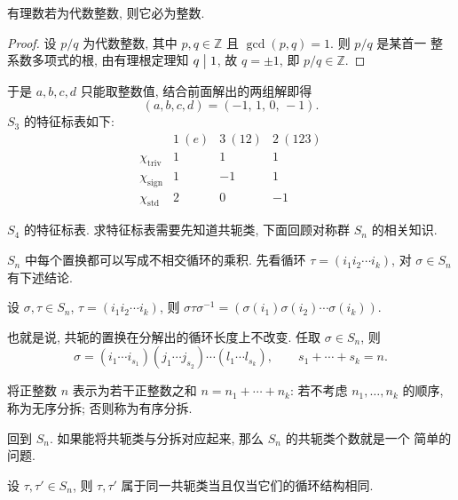 \begin{lemma}\label{lem:rational-alg-int}
有理数若为代数整数, 则它必为整数.
\end{lemma}

\begin{proof}
设 $p/q$ 为代数整数, 其中 $p,q\in\mathbb{Z}$ 且 $\gcd(p,q)=1$. 则 $p/q$ 是某首一
整系数多项式的根, 由有理根定理知 $q\mathrel{\big|} 1$, 故 $q=\pm1$, 即 $p/q\in\mathbb{Z}$.
\end{proof}

于是 $a,b,c,d$ 只能取整数值, 结合前面解出的两组解即得
\[
  (a,b,c,d)=(-1,\,1,\,0,\,-1).
\]
$S_3$ 的特征标表如下:
\[
\begin{array}{c|ccc}
  & 1\ (e) & 3\ (12) & 2\ (123)\\ \hline
  \chi_{\mathrm{triv}} & 1 & 1 & 1\\
  \chi_{\mathrm{sign}} & 1 & -1 & 1\\
  \chi_{\mathrm{std}}  & 2 & 0 & -1
\end{array}
\]

\begin{example}\label{ex:S4-character-table}
$S_4$ 的特征标表. 求特征标表需要先知道共轭类, 下面回顾对称群 $S_n$ 的相关知识.

$S_n$ 中每个置换都可以写成不相交循环的乘积. 先看循环
$\tau=(i_1i_2\cdots i_k)$, 对 $\sigma\in S_n$ 有下述结论.
\end{example}

\begin{theorem}\label{thm:conjugate-cycles}
设 $\sigma,\tau\in S_n$, $\tau=(i_1i_2\cdots i_k)$, 则
$\sigma\tau\sigma^{-1}=(\sigma(i_1)\sigma(i_2)\cdots\sigma(i_k))$.
\end{theorem}

也就是说, 共轭的置换在分解出的循环长度上不改变. 任取 $\sigma\in S_n$, 则
\[
  \sigma=(i_1\cdots i_{s_1})(j_1\cdots j_{s_2})\cdots(l_1\cdots l_{s_k}),
  \qquad s_1+\cdots+s_k=n .
\]

\begin{definition}[分拆]\label{def:partition}
将正整数 $n$ 表示为若干正整数之和 $n=n_1+\cdots+n_k$: 若不考虑
$n_1,\dots,n_k$ 的顺序, 称为无序分拆; 否则称为有序分拆.
\end{definition}

回到 $S_n$. 如果能将共轭类与分拆对应起来, 那么 $S_n$ 的共轭类个数就是一个
简单的问题.

\begin{theorem}\label{thm:conjugate-same-cycle-type}
设 $\tau,\tau'\in S_n$, 则 $\tau,\tau'$ 属于同一共轭类当且仅当它们的循环结构相同.
\end{theorem}

